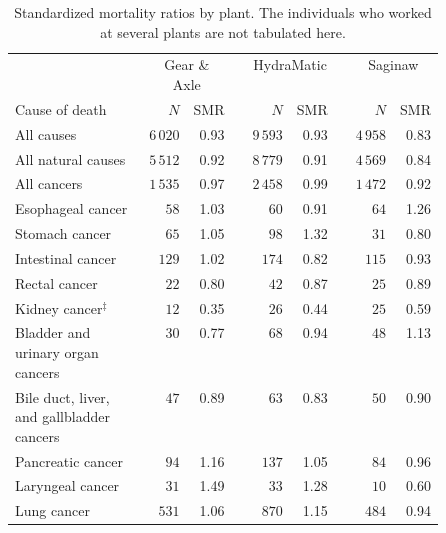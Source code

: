 \documentclass[]{article}
\begin{document}
\begin{table}[H]
\centering
\caption{Standardized mortality ratios by plant. The  individuals who worked at several plants are not tabulated here.} 
\begin{tabular}{p{0.5\linewidth}rrcrrcrr}
  \hline & \multicolumn{2}{c}{Gear \& Axle} && \multicolumn{2}{c}{HydraMatic} && \multicolumn{2}{c}{Saginaw} \\ 
 \cline{2-3}\cline{5-6}\cline{8-9}
Cause of death & $N$ & SMR &   & $N$ & SMR &   & $N$ & SMR \\ 
  \midrule
All causes & $6\,020$ & 0.93 &  & $9\,593$ & 0.93 &  & $4\,958$ & 0.83 \\ 
  All natural causes & $5\,512$ & 0.92 &  & $8\,779$ & 0.91 &  & $4\,569$ & 0.84 \\ 
  All cancers & $1\,535$ & 0.97 &  & $2\,458$ & 0.99 &  & $1\,472$ & 0.92 \\ 
  \hspace{10pt}Esophageal cancer & $58$ & 1.03 &  & $60$ & 0.91 &  & $64$ & 1.26 \\ 
  \hspace{10pt}Stomach cancer & $65$ & 1.05 &  & $98$ & 1.32 &  & $31$ & 0.80 \\ 
  \hspace{10pt}Intestinal cancer & $129$ & 1.02 &  & $174$ & 0.82 &  & $115$ & 0.93 \\ 
  \hspace{10pt}Rectal cancer & $22$ & 0.80 &  & $42$ & 0.87 &  & $25$ & 0.89 \\ 
  \hspace{10pt}Kidney cancer$^\ddagger$ & $12$ & 0.35 &  & $26$ & 0.44 &  & $25$ & 0.59 \\ 
  \hspace{10pt}Bladder and urinary organ cancers & $30$ & 0.77 &  & $68$ & 0.94 &  & $48$ & 1.13 \\ 
  \hspace{10pt}Bile duct, liver, and gallbladder cancers & $47$ & 0.89 &  & $63$ & 0.83 &  & $50$ & 0.90 \\ 
  \hspace{10pt}Pancreatic cancer & $94$ & 1.16 &  & $137$ & 1.05 &  & $84$ & 0.96 \\ 
  \hspace{10pt}Laryngeal cancer & $31$ & 1.49 &  & $33$ & 1.28 &  & $10$ & 0.60 \\ 
  \hspace{10pt}Lung cancer & $531$ & 1.06 &  & $870$ & 1.15 &  & $484$ & 0.94 \\ 

\end{tabular}
\end{table}
\end{document}
